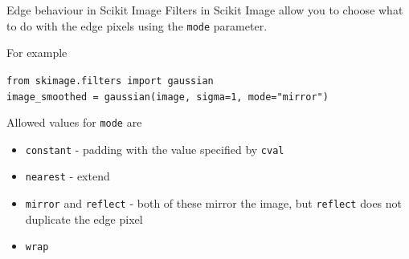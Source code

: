 \documentclass[9pt, aspectratio=169]{beamer}
\begin{document}
\begin{frame}
{
    }
\end{frame}

\begin{frame}
    {Edge behaviour in Scikit Image}
    Filters in Scikit Image allow you to choose what to do with the edge pixels using the \texttt{mode} parameter.

    For example

    \begin{codebox}
        \texttt{from skimage.filters import gaussian\\
            image\_smoothed = gaussian(image, sigma=1, mode="mirror")}
    \end{codebox}

    Allowed values for \texttt{mode} are

    \begin{itemize}
        \item \texttt{constant} - padding with the value specified by \texttt{cval}
        \item \texttt{nearest} - extend
        \item \texttt{mirror} and \texttt{reflect} - both of these mirror the image, but \texttt{reflect} does not duplicate the edge pixel
        \item \texttt{wrap}
    \end{itemize}

\end{frame}
\end{document}
